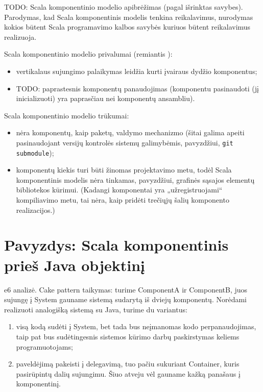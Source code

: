 TODO: Scala komponentinio modelio apibrėžimas (pagal išrinktas savybes).
Parodymas, kad Scala komponentinis modelis tenkina reikalavimus,
nurodymas kokios būtent Scala programavimo kalbos savybės kuriuos
būtent reikalavimus realizuoja.

Scala komponentinio modelio privalumai (remiantis
\cite{classification-framework-for-scm}):
\begin{itemize}
  \item vertikalaus sujungimo\cite[599]{classification-framework-for-scm}
    palaikymas leidžia kurti įvairaus dydžio  komponentus;
  \item TODO: paprastesnis komponentų panaudojimas (komponentu
    pasinaudoti (jį inicializuoti) yra paprasčiau nei komponentų
    ansambliu).
\end{itemize}

Scala komponentinio modelio trūkumai:
\begin{itemize}
  \item nėra komponentų, kaip paketų, valdymo mechanizmo (šitai galima
    apeiti pasinaudojant versijų kontrolės sistemų galimybėmis,
    pavyzdžiui, \verb|git submodule|);
  \item komponentų kiekis turi būti žinomas projektavimo metu, todėl
    Scala komponentinis modelis nėra tinkamas, pavyzdžiui,
    grafinės sąsajos elementų bibliotekos 
    kūrimui. (Kadangi komponentai yra „užregistruojami“
    kompiliavimo metu, tai nėra, kaip pridėti trečiųjų šalių
    komponento realizacijos.)
\end{itemize}

\section{Pavyzdys: Scala komponentinis prieš Java objektinį}

e6 analizė. Cake pattern taikymas: turime ComponentA ir ComponentB,
juos sujungę į System gauname sistemą sudarytą iš dviejų komponentų.
Norėdami realizuoti analogišką sistemą su Java, turime du variantus:
\begin{enumerate}
  \item visą kodą sudėti į System, bet tada bus neįmanomas kodo
    perpanaudojimas, taip pat bus sudėtingesnis sistemos kūrimo
    darbų paskirstymas keliems programuotojams;
  \item \label{scala:exmp:enum:2} paveldėjimą pakeisti į delegavimą,
    tuo pačiu sukuriant Container, kuris pasirūpintų dalių
    sujungimu. Šiuo atveju vėl gauname kažką panašaus į
    komponentinį.
\end{enumerate}

